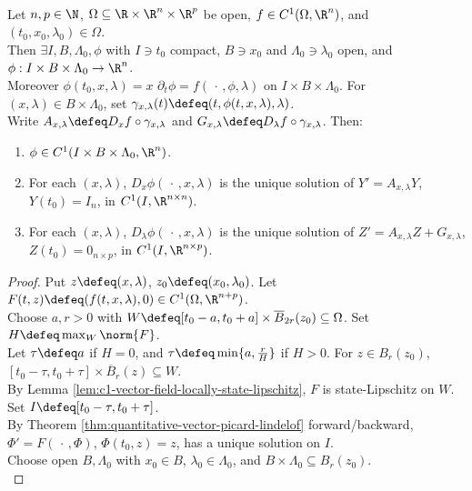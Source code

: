 \begin{theorem} \label{thm:smooth-ode-dependence-and-variational-equations} \\
Let $n,p\in\N$, $\Omega\subseteq\R\times\R^n\times\R^p$ be open, $f\in C^1(\Omega,\R^n)$, and $(t_0,x_0,\lambda_0)\in\Omega$.\\
Then $\exists I,B,\Lambda_0,\phi$ with $I\ni t_0$ compact, $B\ni x_0$ and $\Lambda_0\ni\lambda_0$ open, and $\phi:I\times B\times\Lambda_0\to\R^n$.\\
Moreover $\phi(t_0,x,\lambda)=x$ $\partial_t\phi=f(\,\cdot\,,\phi,\lambda)$ on $I\times B\times\Lambda_0$. For $(x,\lambda)\in B\times\Lambda_0$, set $\gamma_{x,\lambda}(t)\defeq(t,\phi(t,x,\lambda),\lambda)$.\\
Write $A_{x,\lambda}\defeq D_xf\circ\gamma_{x,\lambda}$ and $G_{x,\lambda}\defeq D_\lambda f\circ\gamma_{x,\lambda}$. Then:
\begin{enumerate}[label=(\roman*)]
\setlength{\itemsep}{0pt}
\item $\phi\in C^1(I\times B\times\Lambda_0,\R^n)$.
\item For each $(x,\lambda)$, $D_x\phi(\,\cdot\,,x,\lambda)$ is the unique solution of $Y'=A_{x,\lambda}Y$, $Y(t_0)=I_n$, in $C^1(I,\R^{n\times n})$.
\item For each $(x,\lambda)$, $D_\lambda\phi(\,\cdot\,,x,\lambda)$ is the unique solution of $Z'=A_{x,\lambda}Z+G_{x,\lambda}$, $Z(t_0)=0_{n\times p}$, in $C^1(I,\R^{n\times p})$.
\end{enumerate}
\begin{proof}
Put $z\defeq(x,\lambda)$, $z_0\defeq(x_0,\lambda_0)$. Let $F(t,z)\defeq(f(t,x,\lambda),0)\in C^1(\Omega,\R^{n+p})$.\\
Choose $a,r>0$ with $W\defeq[t_0-a,t_0+a]\times\overline{B}_{2r}(z_0)\subseteq\Omega$. Set $H\defeq\max_W\norm{F}$.\\
Let $\tau\defeq a$ if $H=0$, and $\tau\defeq\min\{a,\frac{r}{H}\}$ if $H>0$. For $z\in B_r(z_0)$, $[t_0-\tau,t_0+\tau]\times\overline{B}_r(z)\subseteq W$.\\
By Lemma \ref{lem:c1-vector-field-locally-state-lipschitz}, $F$ is state-Lipschitz on $W$. Set $I\defeq[t_0-\tau,t_0+\tau]$.\\
By Theorem \ref{thm:quantitative-vector-picard-lindelof} forward/backward, $\Phi'=F(\,\cdot\,,\Phi)$, $\Phi(t_0,z)=z$, has a unique solution on $I$.\\
Choose open $B,\Lambda_0$ with $x_0\in B$, $\lambda_0\in\Lambda_0$, and $B\times\Lambda_0\subseteq B_r(z_0)$.\\

\end{proof}
\end{theorem}
